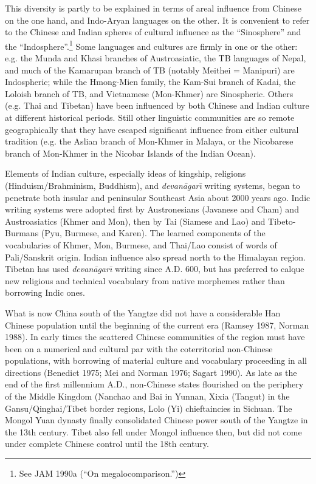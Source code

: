 This diversity is partly to be explained in terms of areal influence from Chinese on the one hand, and Indo-Aryan languages on the other. It is convenient to refer to the Chinese and Indian spheres of cultural influence as the “Sinosphere” and the “Indosphere”.\footnote{See JAM 1990a (“On megalocomparison.”)} Some languages and cultures are firmly in one or the other: e.g. the Munda and Khasi branches of Austroasiatic, the TB languages of Nepal, and much of the Kamarupan branch of TB (notably Meithei = Manipuri) are Indospheric; while the Hmong-Mien family, the Kam-Sui branch of Kadai, the Loloish branch of TB, and Vietnamese (Mon-Khmer) are Sinospheric. Others (e.g. Thai and Tibetan) have been influenced by both Chinese and Indian culture at different historical periods. Still other linguistic communities are so remote geographically that they have escaped significant influence from either cultural tradition (e.g. the Aslian branch of Mon-Khmer in Malaya, or the Nicobarese branch of Mon-Khmer in the Nicobar Islands of the Indian Ocean).

Elements of Indian culture, especially ideas of kingship, religions (Hinduism/Brahminism, Buddhism), and {\it devan\=agar\={\i}} writing systems, began to penetrate both insular and peninsular Southeast Asia about 2000 years ago. Indic writing systems were adopted first by Austronesians (Javanese and Cham) and Austroasiatics (Khmer and Mon), then by Tai (Siamese and Lao) and Tibeto-Burmans (Pyu, Burmese, and Karen). The learned components of the vocabularies of Khmer, Mon, Burmese, and Thai/Lao consist of words of Pali/Sanskrit origin. Indian influence also spread north to the Himalayan region. Tibetan has used {\it devan\=agar\={\i}} writing since A.D. 600, but has preferred to calque new religious and technical vocabulary from native morphemes rather than borrowing Indic ones.

What is now China south of the Yangtze did not have a considerable Han Chinese population until the beginning of the current era (Ramsey 1987, Norman 1988). In early times the scattered Chinese communities of the region must have been on a numerical and cultural par with the coterritorial non-Chinese populations, with borrowing of material culture and vocabulary proceeding in all directions (Benedict 1975; Mei and Norman 1976; Sagart 1990). As late as the end of the first millennium A.D., non-Chinese states flourished on the periphery of the Middle Kingdom (Nanchao and Bai in Yunnan, Xixia (Tangut) in the Gansu/Qinghai/Tibet border regions, Lolo (Yi) chieftaincies in Sichuan. The Mongol Yuan dynasty finally consolidated Chinese power south of the Yangtze in the 13th century. Tibet also fell under Mongol influence then, but did not come under complete Chinese control until the 18th century.

